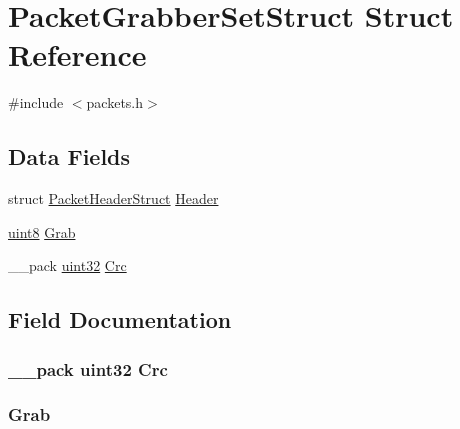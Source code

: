 \hypertarget{struct_packet_grabber_set_struct}{}\section{Packet\+Grabber\+Set\+Struct Struct Reference}
\label{struct_packet_grabber_set_struct}


{\ttfamily \#include $<$packets.\+h$>$}

\subsection*{Data Fields}
\begin{DoxyCompactItemize}
\item 
struct \hyperlink{struct_packet_header_struct}{Packet\+Header\+Struct} \hyperlink{struct_packet_grabber_set_struct_ab201af50281aff5ed4f984f994938007}{Header}
\item 
\hyperlink{_h_y_d_r_a_s_8_x_2types_8h_a33a5e996e7a90acefb8b1c0bea47e365}{uint8} \hyperlink{struct_packet_grabber_set_struct_a9dca87fb1e95e06d40682780fcee339e}{Grab}
\item 
\+\_\+\+\_\+pack \hyperlink{_h_y_d_r_a_s_8_x_2types_8h_acbd4acd0d29e2d6c43104827f77d9cd2}{uint32} \hyperlink{struct_packet_grabber_set_struct_a9ac0191cb1217dfb4164ca0e333de3ac}{Crc}
\end{DoxyCompactItemize}


\subsection{Field Documentation}
\hypertarget{struct_packet_grabber_set_struct_a9ac0191cb1217dfb4164ca0e333de3ac}{}
\subsubsection[{Crc}]{\setlength{\rightskip}{0pt plus 5cm}\+\_\+\+\_\+pack {\bf uint32} Crc}\label{struct_packet_grabber_set_struct_a9ac0191cb1217dfb4164ca0e333de3ac}
\hypertarget{struct_packet_grabber_set_struct_a9dca87fb1e95e06d40682780fcee339e}{}
\subsubsection[{Grab}]{ Grab}\label{struct_packet_grabber_set_struct_a9dca87fb1e95e06d40682780fcee339e}
\hypertarget{struct_packet_grabber_set_struct_ab201af50281aff5ed4f984f994938007}{}
